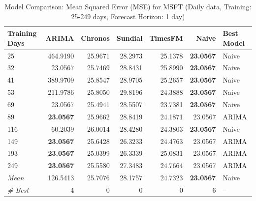 \begin{table}[htbp]
\centering
\caption{Model Comparison: Mean Squared Error (MSE) for MSFT (Daily data, Training: 25-249 days, Forecast Horizon: 1 day)}
\label{tab:comparison_MSFT_1d_train-less-year-log_h1_MSE}
\small
\begin{tabular}{lrrrrrl}
\toprule
Training Days & ARIMA & Chronos & Sundial & TimesFM & Naive & Best Model \\
\midrule
25 & 464.9190 & 25.9671 & 28.2973 & 25.1378 & \textbf{23.0567} & Naive \\
32 & 23.0567 & 25.7469 & 28.8431 & 25.8990 & \textbf{23.0567} & Naive \\
41 & 389.9709 & 25.8547 & 28.9705 & 25.2657 & \textbf{23.0567} & Naive \\
53 & 211.9786 & 25.8050 & 29.8196 & 24.3888 & \textbf{23.0567} & Naive \\
69 & 23.0567 & 25.4941 & 28.5507 & 23.7381 & \textbf{23.0567} & Naive \\
89 & \textbf{23.0567} & 25.9662 & 28.8419 & 24.1871 & 23.0567 & ARIMA \\
116 & 60.2039 & 26.0014 & 28.4280 & 24.3803 & \textbf{23.0567} & Naive \\
149 & \textbf{23.0567} & 25.6428 & 26.3233 & 24.4763 & 23.0567 & ARIMA \\
193 & \textbf{23.0567} & 25.0399 & 26.3339 & 25.0831 & 23.0567 & ARIMA \\
249 & \textbf{23.0567} & 25.5580 & 27.3483 & 24.7664 & 23.0567 & ARIMA \\
\midrule
\textit{Mean} & 126.5413 & 25.7076 & 28.1757 & 24.7323 & \textbf{23.0567} & Naive \\
\textit{\# Best} & 4 & 0 & 0 & 0 & 6 & -- \\
\bottomrule
\end{tabular}
\end{table}